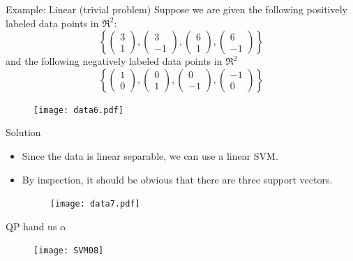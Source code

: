 \begin{frame}{Example: Linear (trivial problem)}
Suppose we are given the following positively labeled data points in $\Re^2$:
\[\left\{ {\left( {\begin{array}{*{20}{c}}
  3 \\ 
  1 
\end{array}} \right),\left( {\begin{array}{*{20}{c}}
  3 \\ 
  { - 1} 
\end{array}} \right),\left( {\begin{array}{*{20}{c}}
  6 \\ 
  1 
\end{array}} \right),\left( {\begin{array}{*{20}{c}}
  6 \\ 
  { - 1} 
\end{array}} \right)} \right\}\]
and the following negatively labeled data points in $\Re^2$
\[\left\{ {\left( {\begin{array}{*{20}{c}}
  1 \\ 
  0 
\end{array}} \right),\left( {\begin{array}{*{20}{c}}
  0 \\ 
  { 1} 
\end{array}} \right),\left( {\begin{array}{*{20}{c}}
  0 \\ 
  -1 
\end{array}} \right),\left( {\begin{array}{*{20}{c}}
  -1 \\ 
  { 0} 
\end{array}} \right)} \right\}\]
\begin{figure}
\texttt{[image: data6.pdf]}
\end{figure}
\end{frame}


\begin{frame}{Solution}
\begin{itemize}
\item Since the data is linear separable, we can use a linear SVM.
\item By inspection, it should be obvious that there are three support vectors.
\begin{figure}
\texttt{[image: data7.pdf]}
\end{figure}
\end{itemize}
\end{frame}
\begin{frame}{QP hand us $\alpha$}
\begin{figure}
\texttt{[image: SVM08]}
\end{figure}
\end{frame}


